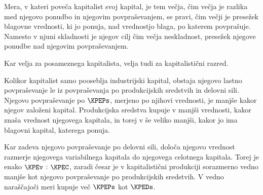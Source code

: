 \documentclass[kapital_02.tex]{subfiles}
\begin{document}
Mera, v kateri poveča kapitalist svoj kapital, je tem večja, čim večja je razlika med njegovo ponudbo in njegovim \KPEstran povpraševanjem, se pravi, čim večji je presežek blagovne vrednosti, ki jo ponuja, nad vrednostjo blaga, po katerem povprašuje. Namesto v njuni skladnosti je njegov cilj čim večja neskladnost, presežek njegove ponudbe nad njegovim povpraševanjem.

Kar velja za posameznega kapitalista, velja tudi za kapitalistični razred.

Kolikor kapitalist samo pooseblja industrijski kapital, obstaja njegovo lastno povpraševanje le iz povpraševanja po produkcijskih sredstvih in delovni sili. Njegovo povpraševanje po \( \KPEPs \), merjeno po njihovi vrednosti, je manjše kakor njegov založeni kapital. Produkcijska sredstva kupuje v manjši vrednosti, kakor znaša vrednost njegovega kapitala, in torej v še veliko manjši, kakor jo ima blagovni kapital, katerega ponuja.

Kar zadeva njegovo povpraševanje po delovni sili, določa njegovo vrednost razmerje njegovega variabilnega kapitala do njegovega celotnega kapitala. Torej je enako \( \KPEv \) : \( \KPEC \), zaradi česar je v kapitalistični produkciji sorazmerno vedno manjše kot njegovo povpraševanje po produkcijskih sredstvih. V vedno naraščajoči meri kupuje več  \( \KPEPs \) kot  \( \KPEDs \).
\end{document}
